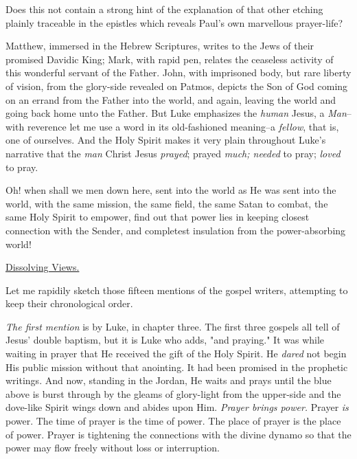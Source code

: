 Does this not contain a strong hint of the explanation of that other
etching plainly traceable in the epistles which reveals Paul's own
marvellous prayer-life?

Matthew, immersed in the Hebrew Scriptures, writes to the Jews of their
promised Davidic King; Mark, with rapid pen, relates the ceaseless
activity of this wonderful servant of the Father. John, with imprisoned
body, but rare liberty of vision, from the glory-side revealed on Patmos,
depicts the Son of God coming on an errand from the Father into the world,
and again, leaving the world and going back home unto the Father. But Luke
emphasizes the \textit{human} Jesus, a \textit{Man}--with reverence let me use a word in
its old-fashioned meaning--a \textit{fellow}, that is, one of ourselves. And the
Holy Spirit makes it very plain throughout Luke's narrative that the \textit{man}
Christ Jesus \textit{prayed}; prayed \textit{much; needed} to pray; \textit{loved} to pray.

Oh! when shall we men down here, sent into the world as He was sent into
the world, with the same mission, the same field, the same Satan to
combat, the same Holy Spirit to empower, find out that power lies in
keeping closest connection with the Sender, and completest insulation from
the power-absorbing world!



\underline{Dissolving Views.}


Let me rapidily sketch those fifteen mentions of the gospel writers,
attempting to keep their chronological order.

\textit{The first mention} is by Luke, in chapter three. The first three gospels
all tell of Jesus' double baptism, but it is Luke who adds, "and praying."
It was while waiting in prayer that He received the gift of the Holy
Spirit. He \textit{dared} not begin His public mission without that anointing. It
had been promised in the prophetic writings. And now, standing in the
Jordan, He waits and prays until the blue above is burst through by the
gleams of glory-light from the upper-side and the dove-like Spirit wings
down and abides upon Him. \textit{Prayer brings power.} Prayer \textit{is} power. The
time of prayer is the time of power. The place of prayer is the place of
power. Prayer is tightening the connections with the divine dynamo so that
the power may flow freely without loss or interruption.


